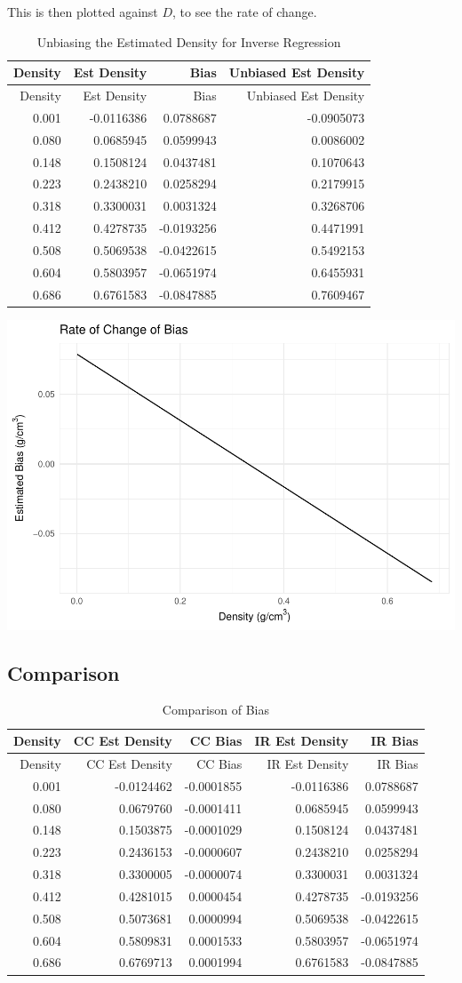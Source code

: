\documentclass[]{article}
\begin{document}
This is then plotted against \(D\), to see the rate of change.

\begin{longtable}[]{@{}rrrr@{}}
\caption{Unbiasing the Estimated Density for Inverse
Regression}\tabularnewline
\toprule
Density & Est Density & Bias & Unbiased Est Density\tabularnewline
\midrule
\endfirsthead
\toprule
Density & Est Density & Bias & Unbiased Est Density\tabularnewline
\midrule
\endhead
0.001 & -0.0116386 & 0.0788687 & -0.0905073\tabularnewline
0.080 & 0.0685945 & 0.0599943 & 0.0086002\tabularnewline
0.148 & 0.1508124 & 0.0437481 & 0.1070643\tabularnewline
0.223 & 0.2438210 & 0.0258294 & 0.2179915\tabularnewline
0.318 & 0.3300031 & 0.0031324 & 0.3268706\tabularnewline
0.412 & 0.4278735 & -0.0193256 & 0.4471991\tabularnewline
0.508 & 0.5069538 & -0.0422615 & 0.5492153\tabularnewline
0.604 & 0.5803957 & -0.0651974 & 0.6455931\tabularnewline
0.686 & 0.6761583 & -0.0847885 & 0.7609467\tabularnewline
\bottomrule
\end{longtable}

\includegraphics{Project_05_files/figure-latex/IR Unbias-1.pdf}

\subsection{Comparison}\label{comparison}

\begin{longtable}[]{@{}rrrrr@{}}
\caption{Comparison of Bias}\tabularnewline
\toprule
Density & CC Est Density & CC Bias & IR Est Density & IR
Bias\tabularnewline
\midrule
\endfirsthead
\toprule
Density & CC Est Density & CC Bias & IR Est Density & IR
Bias\tabularnewline
\midrule
\endhead
0.001 & -0.0124462 & -0.0001855 & -0.0116386 & 0.0788687\tabularnewline
0.080 & 0.0679760 & -0.0001411 & 0.0685945 & 0.0599943\tabularnewline
0.148 & 0.1503875 & -0.0001029 & 0.1508124 & 0.0437481\tabularnewline
0.223 & 0.2436153 & -0.0000607 & 0.2438210 & 0.0258294\tabularnewline
0.318 & 0.3300005 & -0.0000074 & 0.3300031 & 0.0031324\tabularnewline
0.412 & 0.4281015 & 0.0000454 & 0.4278735 & -0.0193256\tabularnewline
0.508 & 0.5073681 & 0.0000994 & 0.5069538 & -0.0422615\tabularnewline
0.604 & 0.5809831 & 0.0001533 & 0.5803957 & -0.0651974\tabularnewline
0.686 & 0.6769713 & 0.0001994 & 0.6761583 & -0.0847885\tabularnewline
\bottomrule
\end{longtable}
\end{document}
